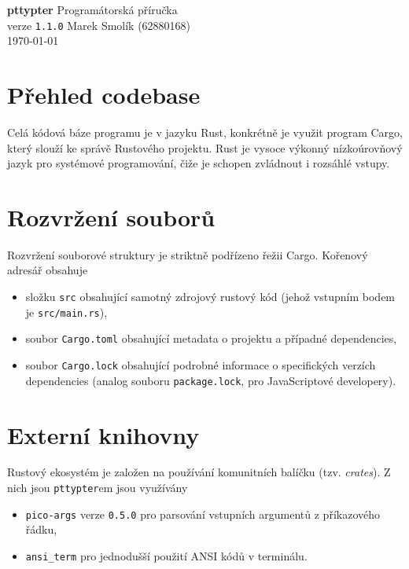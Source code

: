 \documentclass[11pt, letterpaper]{article}
\begin{document}
 
\begin{center}
\vfill
{\Huge \textbf{pttypter}}
\vfill
{\huge Programátorská příručka} \\
{\large verze \texttt{1.1.0}}
\vfill
{\Large Marek Smolík (62880168)} \\
\today
\vfill
\end{center}

\section{Přehled codebase}

Celá kódová báze programu je v jazyku Rust, konkrétně je využit program Cargo, který slouží ke správě Rustového projektu. Rust je vysoce výkonný nízkoúrovňový jazyk pro systémové programování, čiže je schopen zvládnout i rozsáhlé vstupy.

\section{Rozvržení souborů}
Rozvržení souborové struktury je striktně podřízeno řežii Cargo. Kořenový adresář obsahuje

\begin{itemize}
    \item složku \texttt{src} obsahující samotný zdrojový rustový kód (jehož vstupním bodem je \texttt{src/main.rs}),~
    \item soubor \texttt{Cargo.toml} obsahující metadata o projektu a případné dependencies,
    \item soubor \texttt{Cargo.lock} obsahující podrobné informace o specifických verzích dependencies (analog souboru \texttt{package.lock}, pro JavaScriptové developery).
\end{itemize}

\section{Externí knihovny}
Rustový ekosystém je založen na používání komunitních balíčku (tzv. \textit{crates}). Z nich jsou  \texttt{pttypter}em jsou využívány
\begin{itemize}
    \item \texttt{pico-args} verze \texttt{0.5.0} pro parsování vstupních argumentů z příkazového řádku,
    \item \texttt{ansi\_term} pro jednodušší použití ANSI kódů v terminálu.
\end{itemize}
\end{document}
